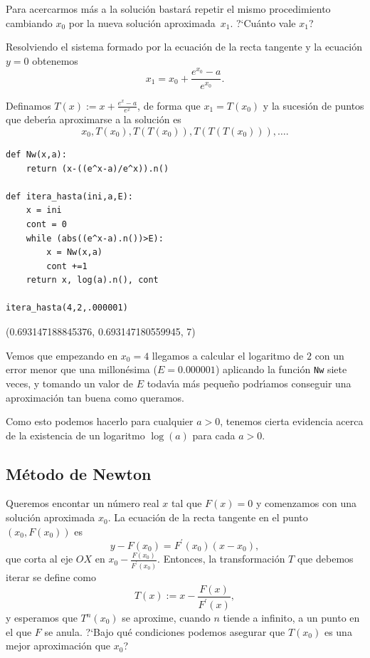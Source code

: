 Para acercarmos m\'as a la soluci\'on bastar\'a repetir el mismo procedimiento
cambiando $x_0$ por la nueva soluci\'on aproximada~$x_1$. ?`Cu\'anto vale $x_1$?

Resolviendo el sistema formado por la ecuaci\'on de la recta tangente y la
ecuaci\'on $y=0$ obtenemos
\[x_1=x_0+\frac{e^{x_0}-a}{e^{x_0}}.\]

Definamos $T(x):= x+\frac{e^{x}-a}{e^x}$, de forma que $x_1=T(x_0)$ y la
sucesi\'on de puntos que deber\'{\i}a aproximarse a la soluci\'on es 
\[x_0,T(x_0),T(T(x_0)),T(T(T(x_0))),\dots.\]

\begin{lstlisting}[title=Método de Newton]
def Nw(x,a):
    return (x-((e^x-a)/e^x)).n()
    
def itera_hasta(ini,a,E):
    x = ini
    cont = 0
    while (abs((e^x-a).n())>E):
        x = Nw(x,a)
        cont +=1
    return x, log(a).n(), cont
    
itera_hasta(4,2,.000001)
\end{lstlisting}
\begin{Output}
	(0.693147188845376, 0.693147180559945, 7)
\end{Output}

% 
% 


Vemos que empezando en $x_0=4$ llegamos a calcular el logaritmo de $2$ con un
error menor que una millon\'esima ($E=0{.}000001$) aplicando la funci\'on
\lstinline$Nw$
siete veces,  y  tomando un valor de $E$ todav\'{\i}a m\'as peque\~no
podr\'{\i}amos conseguir una aproximaci\'on tan buena como queramos. 


Como esto podemos hacerlo para cualquier $a>0$, tenemos cierta evidencia acerca
de la existencia de un logaritmo $\log(a)$ para cada $a>0$. 


\subsection{M\'etodo de Newton}

Queremos encontar un n\'umero real $x$ tal que $F(x)=0$ y comenzamos con una
soluci\'on aproximada $x_0$.
La ecuaci\'on de la recta tangente en el punto $(x_0,F(x_0))$ es 
\[y-F(x_0)=F^{\prime}(x_0)(x-x_0),\]
que corta al eje $OX$ en $x_0-\frac{F(x_0)}{F^{\prime}(x_0)}.$ Entonces, la
transformaci\'on $T$ que debemos iterar se define como
\[T(x):=x-\frac{F(x)}{F^{\prime}(x)},\]
\noindent y esperamos que $T^n(x_0)$ se aproxime, cuando $n$ tiende a infinito, 
a un punto en el que $F$ se anula. ?`Bajo qu\'e condiciones podemos asegurar que
$T(x_0)$ es una mejor aproximaci\'on que $x_0$?

